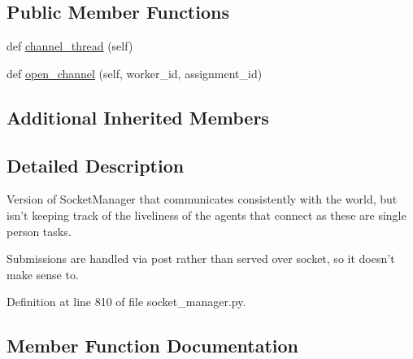 \subsection*{Public Member Functions}
\begin{DoxyCompactItemize}
\item 
def \hyperlink{classparlai_1_1mturk_1_1core_1_1socket__manager_1_1StaticSocketManager_ac141271b1df6f50a5bfee040d7904696}{channel\+\_\+thread} (self)
\item 
def \hyperlink{classparlai_1_1mturk_1_1core_1_1socket__manager_1_1StaticSocketManager_a4672bc8a07f4ae122338ceb3a59cd54a}{open\+\_\+channel} (self, worker\+\_\+id, assignment\+\_\+id)
\end{DoxyCompactItemize}
\subsection*{Additional Inherited Members}


\subsection{Detailed Description}
\begin{DoxyVerb}Version of SocketManager that communicates consistently with the world, but isn't
keeping track of the liveliness of the agents that connect as these are single
person tasks.

Submissions are handled via post rather than served over socket, so it doesn't make
sense to.
\end{DoxyVerb}
 

Definition at line 810 of file socket\+\_\+manager.\+py.



\subsection{Member Function Documentation}
\mbox{\label{classparlai_1_1mturk_1_1core_1_1socket__manager_1_1StaticSocketManager_ac141271b1df6f50a5bfee040d7904696}} 

